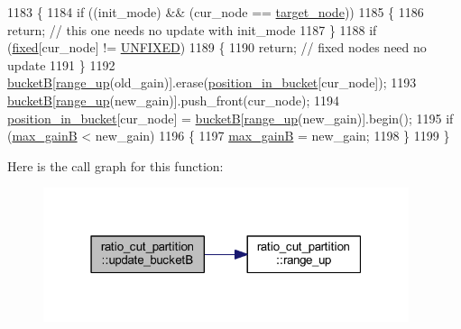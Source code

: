 \begin{DoxyCode}
1183 \{
1184     \textcolor{keywordflow}{if} ((init\_mode) && (cur\_node == \mbox{\hyperlink{classratio__cut__partition_a343ba76869e64141fb795010e388744b}{target\_node}}))
1185     \{
1186     \textcolor{keywordflow}{return}; \textcolor{comment}{// this one needs no update with init\_mode}
1187     \}
1188     \textcolor{keywordflow}{if} (\mbox{\hyperlink{classratio__cut__partition_ad77023b9f60e88274bf54f2019404768}{fixed}}[cur\_node] != \mbox{\hyperlink{classratio__cut__partition_a153cc7e51ac5d72a00671b6bdbcc6fa5}{UNFIXED}})
1189     \{
1190     \textcolor{keywordflow}{return}; \textcolor{comment}{// fixed nodes need no update}
1191     \}
1192     \mbox{\hyperlink{classratio__cut__partition_a68f6fa1360b848a0a046e1adf3827f05}{bucketB}}[\mbox{\hyperlink{classratio__cut__partition_a5cda26b908793b59881798d88b07344c}{range\_up}}(old\_gain)].erase(\mbox{\hyperlink{classratio__cut__partition_a871af9a7ed4cb1c101e6620ff99cb8d7}{position\_in\_bucket}}[cur\_node]);
1193     \mbox{\hyperlink{classratio__cut__partition_a68f6fa1360b848a0a046e1adf3827f05}{bucketB}}[\mbox{\hyperlink{classratio__cut__partition_a5cda26b908793b59881798d88b07344c}{range\_up}}(new\_gain)].push\_front(cur\_node);
1194     \mbox{\hyperlink{classratio__cut__partition_a871af9a7ed4cb1c101e6620ff99cb8d7}{position\_in\_bucket}}[cur\_node] = \mbox{\hyperlink{classratio__cut__partition_a68f6fa1360b848a0a046e1adf3827f05}{bucketB}}[\mbox{\hyperlink{classratio__cut__partition_a5cda26b908793b59881798d88b07344c}{range\_up}}(new\_gain)].begin();
1195     \textcolor{keywordflow}{if} (\mbox{\hyperlink{classratio__cut__partition_af184ffdb46e49b1fc95faa1e6a91cc8e}{max\_gainB}} < new\_gain)
1196     \{
1197     \mbox{\hyperlink{classratio__cut__partition_af184ffdb46e49b1fc95faa1e6a91cc8e}{max\_gainB}} = new\_gain;
1198     \}
1199 \}
\end{DoxyCode}
Here is the call graph for this function\+:\nopagebreak
\begin{figure}[H]
\begin{center}
\leavevmode
\includegraphics[width=304pt]{classratio__cut__partition_abe5d474e6d99c7bb200071d6484b5358_cgraph}
\end{center}
\end{figure}
